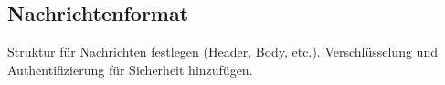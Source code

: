 \subsection{Nachrichtenformat}

Struktur für Nachrichten festlegen (Header, Body, etc.).
Verschlüsselung und Authentifizierung für Sicherheit hinzufügen.
